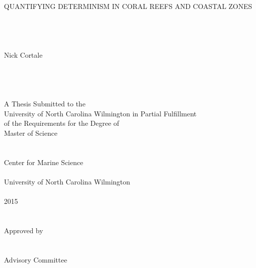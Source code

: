 \documentclass[12 pt]{uncw_thesis}
\begin{document}
%
%
\pagestyle{empty} 
\begin{singlespace}
\begin{center}
     \hskip 1pt \\
     \hskip 1pt \\    %
     { QUANTIFYING DETERMINISM IN CORAL REEFS AND COASTAL ZONES}\\
     \hskip 1pt \\
     \hskip 1pt \\
     \hskip 1pt \\
     \hskip 1pt \\    %
     Nick Cortale\\
     \hskip 1pt \\
     \hskip 1pt \\
     \hskip 1pt \\
     \hskip 1pt \\    %
    A Thesis Submitted to the\\
    University of North Carolina Wilmington in Partial Fulfillment\\
    of the Requirements for the Degree of\\
    Master of Science\\
    \hskip 1pt \\
    \hskip 1pt \\    %
    Center for Marine Science\\
    \hskip 1pt \\    %
    University of North Carolina Wilmington\\
    \hskip 1pt \\    %
    2015\\
    \hskip 1pt \\
    \hskip 1pt \\    %
    Approved by\\
    \hskip 1pt \\
    \hskip 1pt \\    %
    Advisory Committee\\
    \hskip 1pt \\
    \hskip 1pt \\    %
\end{center}

\begin{center}
		

\end{center}
\end{singlespace}
\end{document}
